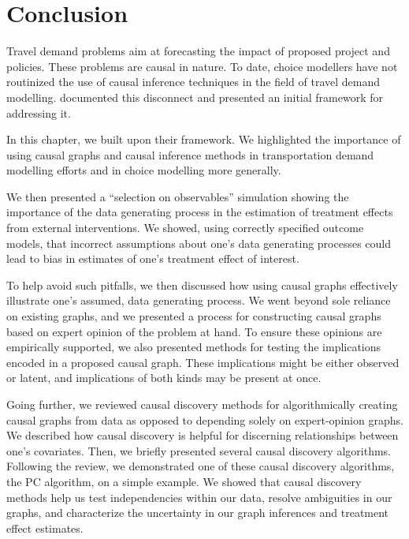 \section{Conclusion}
\label{sec:conclusion}

Travel demand problems aim at forecasting the impact of proposed project and policies.
These problems are causal in nature.
To date, choice modellers have not routinized the use of causal inference techniques in the field of travel demand modelling.
\citet{brathwaite_2018_causal} documented this disconnect and presented an initial framework for addressing it.

In this chapter, we built upon their framework.
We highlighted the importance of using causal graphs and causal inference methods in transportation demand modelling efforts and in choice modelling more generally.

We then presented a ``selection on observables'' simulation showing the importance of the data generating process in the estimation of treatment effects from external interventions.
We showed, using correctly specified outcome models, that incorrect assumptions about one's data generating processes could lead to bias in estimates of one's treatment effect of interest.

To help avoid such pitfalls, we then discussed how using causal graphs effectively illustrate one's assumed, data generating process.
We went beyond sole reliance on existing graphs, and we presented a process for constructing causal graphs based on expert opinion of the problem at hand.
To ensure these opinions are empirically supported, we also presented methods for testing the implications encoded in a proposed causal graph.
These implications might be either observed or latent, and implications of both kinds may be present at once.

Going further, we reviewed causal discovery methods for algorithmically creating causal graphs from data as opposed to depending solely on expert-opinion graphs.
We described how causal discovery is helpful for discerning relationships between one's covariates.
Then, we briefly presented several causal discovery algorithms.
Following the review, we demonstrated one of these causal discovery algorithms, the PC algorithm, on a simple example.
We showed that causal discovery methods help us test independencies within our data,
resolve ambiguities in our graphs,
and characterize the uncertainty in our graph inferences and treatment effect estimates.

